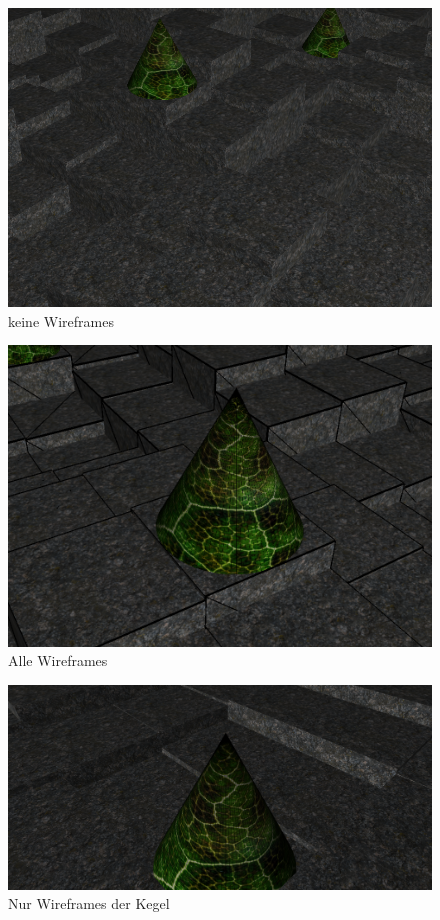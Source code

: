 \documentclass{article}
\begin{document}
\begin{minipage}{0.5\textwidth}
\begin{figure}[H]
    \includegraphics[scale=0.274]{wmode3.png}
    \caption{keine Wireframes}
\end{figure}
\end{minipage}
\begin{minipage}{0.5\textwidth}
\begin{figure}[H]
    \includegraphics[scale=0.225]{wmode4.png}
    \caption{Alle Wireframes}
\end{figure}
\end{minipage}
\begin{figure}[H]
    \centering
    \includegraphics[scale=0.15]{wmode5.png}
    \caption{Nur Wireframes der Kegel}
\end{figure}
\end{document}
